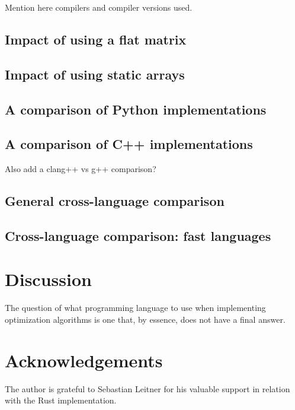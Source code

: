 \documentclass[11pt,a4paper,notitlepage]{article}
\begin{document}
Mention here compilers and compiler versions used.

\subsection{Impact of using a flat matrix}
\subsection{Impact of using static arrays}
\subsection{A comparison of Python implementations}
\subsection{A comparison of C++ implementations}
Also add a clang++ vs g++ comparison?
\subsection{General cross-language comparison}
\subsection{Cross-language comparison: fast languages}

\section{Discussion}
The question of what programming language to use when implementing
optimization algorithms is one that, by essence, does not have a final
answer.

\section*{Acknowledgements}
The author is grateful to Sebastian Leitner for his valuable support
in relation with the Rust implementation.



\end{document}
